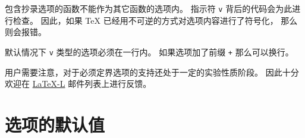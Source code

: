 \documentclass{l3doc}
\begin{document}
%
包含抄录选项的函数不能作为其它函数的选项内。
指示符 \texttt{v} 背后的代码会为此进行检查。
因此，如果 \TeX{} 已经用不可逆的方式对选项内容进行了符号化，
那么则会报错。

%
默认情况下 \texttt{v} 类型的选项必须在一行内。
如果选项加了前缀 \texttt{+} 那么可以换行。

%
用户需要注意，对于必须定界选项的支持还处于一定的实验性质阶段。
因此十分欢迎在 \href{http://news.gmane.org/group/gmane.comp.tex.latex.latex3}{LaTeX-L} 邮件列表上进行反馈。

%
\section{选项的默认值}
\end{document}
